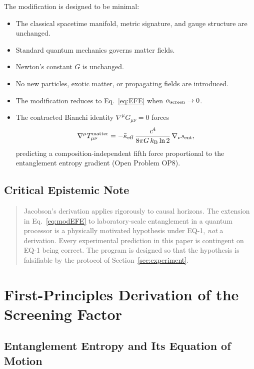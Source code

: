 \documentclass[12pt,letterpaper]{article}
\theoremstyle{definition}
\theoremstyle{remark}
\newcommand{\ascreen}{\alpha_{\rm screen}}
\newcommand{\keff}{\tilde{\kappa}_{\rm eff}}
\newcommand{\sent}{s_{\rm ent}}
\newcommand{\kB}{k_{\rm B}}
\begin{document}
The modification is designed to be minimal:
\begin{itemize}[noitemsep]
\item The classical spacetime manifold, metric signature, and gauge structure are
      unchanged.
\item Standard quantum mechanics governs matter fields.
\item Newton's constant $G$ is unchanged.
\item No new particles, exotic matter, or propagating fields are introduced.
\item The modification reduces to Eq.~\eqref{eq:EFE} when $\ascreen\to 0$.
\item The contracted Bianchi identity $\nabla^\mu G_{\mu\nu} = 0$ forces
      \[
        \nabla^\mu T^\mathrm{matter}_{\mu\nu}
        = -\keff\,\frac{c^4}{8\pi G\,\kB\ln 2}\,\nabla_\nu \sent,
      \]
      predicting a composition-independent fifth force proportional to the
      entanglement entropy gradient (Open Problem OP8).
\end{itemize}

\subsection{Critical Epistemic Note}

\begin{quote}
Jacobson's derivation applies rigorously to causal horizons.
The extension in Eq.~\eqref{eq:modEFE} to laboratory-scale entanglement in a quantum
processor is a physically motivated hypothesis under EQ-1, \emph{not} a derivation.
Every experimental prediction in this paper is contingent on EQ-1 being correct.
The program is designed so that the hypothesis is falsifiable by the protocol of
Section~\ref{sec:experiment}.
\end{quote}

\section{First-Principles Derivation of the Screening Factor}
\label{sec:screening}

\subsection{Entanglement Entropy and Its Equation of Motion}
\end{document}
